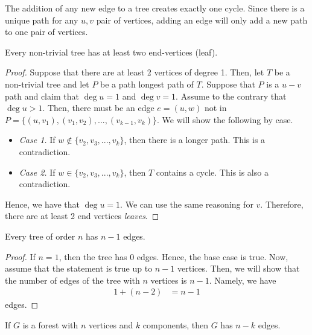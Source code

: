 \begin{remark}
  The addition of any new edge to a tree creates exactly one cycle. Since there
  is a unique path for any \(u, v\) pair of vertices, adding an edge will only
  add a new path to one pair of vertices.
\end{remark}

\begin{theorem}
  Every non-trivial tree has at least two end-vertices (leaf).
\end{theorem}

\begin{proof}
  Suppose that there are at least 2 vertices of degree 1. Then, let \(T\) be a
  non-trivial tree and let \(P\) be a path longest path of \(T\). Suppose that
  \(P\) is a \(u-v\) path and claim that \(\deg u = 1\) and \(\deg v = 1\).
  Assume to the contrary that \(\deg u > 1\). Then, there must be an edge \(e =
  (u, w)\) not in \(P = \{(u, v_1), (v_1, v_2), ..., (v_{k-1}, v_{k})\}\). We
  will show the following by case. 
  \begin{itemize}
    \item \textit{Case 1.} If \(w \notin \{v_2, v_3, ..., v_k\}\), then there is
      a longer path. This is a contradiction.
    \item \textit{Case 2.} If \(w \in \{v_2, v_3, ..., v_{k}\}\), then \(T\)
      contains a cycle. This is also a contradiction.
  \end{itemize}
  Hence, we have that \(\deg u = 1\). We can use the same reasoning for \(v\).
  Therefore, there are at least 2 end vertices \textit{leaves}.
\end{proof}


\begin{theorem}
  Every tree of order \(n\) has \(n-1\) edges.
\end{theorem}

\begin{proof}
  If \(n=1\), then the tree has 0 edges. Hence, the base case is true. Now,
  assume that the statement is true up to \(n-1\) vertices. Then, we will show
  that the number of edges of the tree with \(n\) vertices is \(n-1\). Namely,
  we have 
  \[ 
    \begin{aligned}
      1 + (n-2) &= n-1
    \end{aligned}
  \]
  edges.
\end{proof}

\begin{corollary}
  If \(G\) is a forest with \(n\) vertices and \(k\) components, then \(G\) has
  \(n-k\) edges.
\end{corollary}

